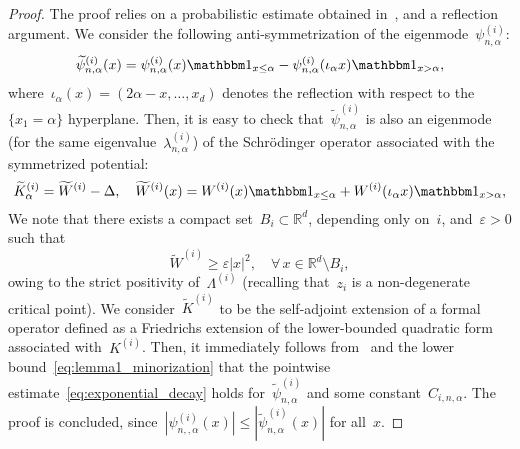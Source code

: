 \documentclass[10pt]{article}
\newcommand{\R}{\mathbb{R}}
\newcommand{\1}{\mathbbm 1}
\newcommand{\psii}[2]{\psi^{(i)}_{#1,#2}}
\newcommand{\lambdai}[2]{\lambda^{(i)}_{#1,#2}}
\begin{document}
    \begin{proof}
        The proof relies on a probabilistic estimate obtained in~\cite{C78}, and a reflection argument.
        We consider the following anti-symmetrization of the eigenmode~$\psii{n}{\alpha}$:
        \begin{equation}
            \widetilde{\psi}^{(i)}_{n,\alpha}(x) = \psii{n}{\alpha}(x)\1_{x\leq \alpha} - \psii{n}{\alpha}(\iota_\alpha x)\1_{x>\alpha},
        \end{equation}
        where~$\iota_\alpha(x) = (2\alpha-x,\dots,x_d)$ denotes the reflection with respect to the~$\{x_1 = \alpha\}$ hyperplane. Then, it is easy to check that~$\widetilde{\psi}^{(i)}_{n,\alpha}$
        is also an eigenmode (for the same eigenvalue~$\lambdai{n}{\alpha}$) of the Schr\"odinger operator associated with the symmetrized potential:
        \begin{equation}
            \widetilde K^{(i)}_\alpha = \widetilde W^{(i)} - \Delta,\quad \widetilde W^{(i)}(x) = W^{(i)}(x)\1_{x\leq \alpha} + W^{(i)}(\iota_\alpha x)\1_{x>\alpha},
        \end{equation}
        We note that there exists a compact set~$B_i\subset \R^d$, depending only on~$i$, and~$\varepsilon>0$ such that
        \begin{equation}
            \label{eq:lemma1_minorization}
            \widetilde W^{(i)} \geq \varepsilon|x|^2,\quad \forall\,x\in \R^d\setminus B_i,
        \end{equation}
        owing to the strict positivity of~$\Lambda^{(i)}$ (recalling that~$z_i$ is a non-degenerate critical point).
        We consider~$\widetilde K^{(i)}$ to be the self-adjoint extension of a formal operator defined as a Friedrichs extension of the lower-bounded quadratic form associated with~$K^{(i)}$.
        Then, it immediately follows from~\cite[Proposition 3.1]{C78} and the lower bound~\eqref{eq:lemma1_minorization} that the pointwise estimate~\eqref{eq:exponential_decay} holds for~$\widetilde\psi^{(i)}_{n,\alpha}$ and some constant~$C_{i,n,\alpha}$.
        The proof is concluded, since~$|\psii{n}{,\alpha}(x)|\leq |\widetilde\psi^{(i)}_{n,\alpha}(x)|$ for all~$x$.
    \end{proof}



        
\end{document}
